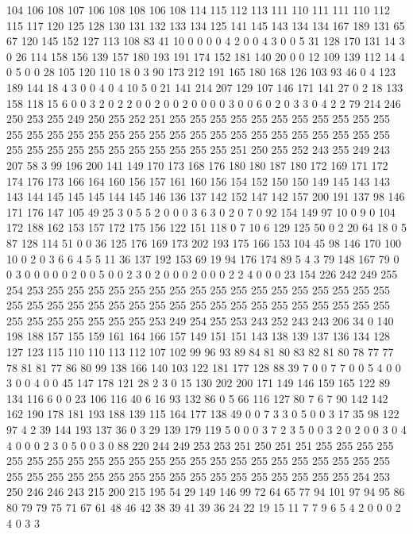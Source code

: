 104 106 108 107 106 108 108 106 108 114 115 112 113 111 110 111 111 110 112 115
117 120 125 128 130 131 132 133 134 125 141 145 143 134 134 167 189 131 65 67
120 145 152 127 113 108 83 41 10 0 0 0 0 4 2 0 0 4 3 0
0 5 31 128 170 131 14 3 0 26 114 158 156 139 157 180 193 191 174 152
181 140 20 0 0 12 109 139 112 14 4 0 5 0 0 28 105 120 110 18
0 3 90 173 212 191 165 180 168 126 103 93 46 0 4 123 189 144 18 4
3 0 0 4 0 4 10 5 0 21 141 214 207 129 107 146 171 141 27 0
2 18 133 158 118 15 6 0 0 3 2 0 2 2 0 0 2 0 0 2
0 0 0 0 3 0 0 6 0 2 0 3 3 0 4 2 2 79 214 246
250 253 255 249 250 255 252 251 255 255 255 255 255 255 255 255 255 255 255 255
255 255 255 255 255 255 255 255 255 255 255 255 255 255 255 255 255 255 255 255
255 255 255 255 255 255 255 255 255 251 250 255 252 243 255 249 243 207 58 3
99 196 200 141 149 170 173 168 176 180 180 187 180 172 169 171 172 174 176 173
166 164 160 156 157 161 160 156 154 152 150 150 149 145 143 143 143 144 145 145
145 144 145 146 136 137 142 152 147 142 157 200 191 137 98 146 171 176 147 105
49 25 3 0 5 5 2 0 0 0 3 6 3 0 2 0 7 0 92 154
149 97 10 0 9 0 104 172 188 162 153 157 172 175 156 122 151 118 0 7
10 6 129 125 50 0 2 20 64 18 0 5 87 128 114 51 0 0 36 125
176 169 173 202 193 175 166 153 104 45 98 146 170 100 10 0 2 0 3 6
6 4 5 5 11 36 137 192 153 69 19 94 176 174 89 5 4 3 79 148
167 79 0 0 3 0 0 0 0 0 2 0 0 5 0 0 2 3 0 2
0 0 0 2 0 0 0 2 2 4 0 0 0 23 154 226 242 249 255 254
253 255 255 255 255 255 255 255 255 255 255 255 255 255 255 255 255 255 255 255
255 255 255 255 255 255 255 255 255 255 255 255 255 255 255 255 255 255 255 255
255 255 255 255 253 249 254 255 253 243 252 243 243 206 34 0 140 198 188 157
155 159 161 164 166 157 149 151 151 143 138 139 137 136 134 128 127 123 115 110
110 113 112 107 102 99 96 93 89 84 81 80 83 82 81 80 78 77 77 78
81 81 77 86 80 99 138 166 140 103 122 181 177 128 88 39 7 0 0 7
7 0 0 5 4 0 0 3 0 0 4 0 0 45 147 178 121 28 2 3
0 15 130 202 200 171 149 146 159 165 122 89 134 116 6 0 0 23 106 116
40 6 16 93 132 86 0 5 66 116 127 80 7 6 7 90 142 142 162 190
178 181 193 188 139 115 164 177 138 49 0 0 7 3 3 0 5 0 0 3
17 35 98 122 97 4 2 39 144 193 137 36 0 3 29 139 179 119 5 0
0 0 3 7 2 3 5 0 0 3 2 0 2 0 0 3 0 4 4 0
0 0 2 3 0 5 0 0 3 0 88 220 244 249 253 253 251 250 251 251
255 255 255 255 255 255 255 255 255 255 255 255 255 255 255 255 255 255 255 255
255 255 255 255 255 255 255 255 255 255 255 255 255 255 255 255 255 255 255 255
254 253 250 246 246 243 215 200 215 195 54 29 149 146 99 72 64 65 77 94
101 97 94 95 86 80 79 79 75 71 67 61 48 46 42 38 39 41 39 36
24 22 19 15 11 7 7 9 6 5 4 2 0 0 0 2 4 0 3 3
